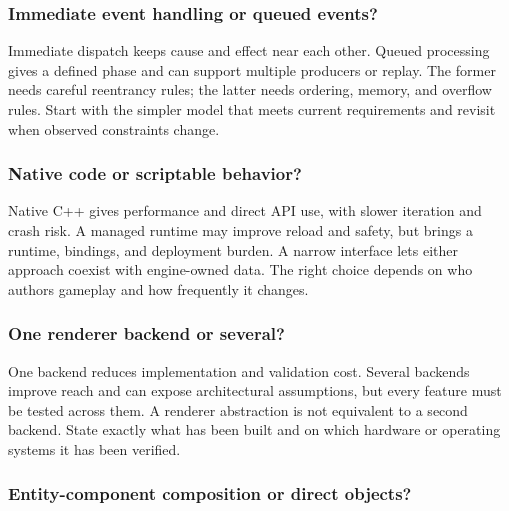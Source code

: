 \subsubsection{Immediate event handling or queued events?}\label{06-engine-ii-ch041-immediate-event-handling-or-queued-events}

\hypertarget{06-engine-ii-ch041-immediate-event-handling-or-queued-events}{}

Immediate dispatch keeps cause and effect near each other. Queued processing gives a defined phase and can support multiple producers or replay. The former needs careful reentrancy rules; the latter needs ordering, memory, and overflow rules. Start with the simpler model that meets current requirements and revisit when observed constraints change.

\subsubsection{Native code or scriptable behavior?}\label{06-engine-ii-ch041-native-code-or-scriptable-behavior}

\hypertarget{06-engine-ii-ch041-native-code-or-scriptable-behavior}{}

Native C++ gives performance and direct API use, with slower iteration and crash risk. A managed runtime may improve reload and safety, but brings a runtime, bindings, and deployment burden. A narrow interface lets either approach coexist with engine-owned data. The right choice depends on who authors gameplay and how frequently it changes.

\subsubsection{One renderer backend or several?}\label{06-engine-ii-ch041-one-renderer-backend-or-several}

\hypertarget{06-engine-ii-ch041-one-renderer-backend-or-several}{}

One backend reduces implementation and validation cost. Several backends improve reach and can expose architectural assumptions, but every feature must be tested across them. A renderer abstraction is not equivalent to a second backend. State exactly what has been built and on which hardware or operating systems it has been verified.

\subsubsection{Entity-component composition or direct objects?}\label{06-engine-ii-ch041-entity-component-composition-or-direct-objects}


